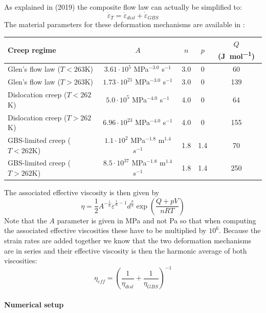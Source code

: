 As explained in \textcite{kuwd19} (2019) the composite flow law can actually be simplified to:
\[
\dot{\varepsilon}_T = \dot{\varepsilon}_{disl} + \dot{\varepsilon}_{GBS}
\]
The material parameters for these deformation mechanisms are available in \cite{kudd19}:
\begin{center}
\begin{tabular}{lcccc}
\hline
Creep regime & $A$ & $n$ & $p$ & $Q$ (\si{\joule\per\mole}) \\
\hline\hline
Glen's flow law ($T<263$K) &$3.61\cdot10^5$ MPa$^{-3.0}$ s$^{-1}$ &3.0 &0 &60\\
Glen's flow law ($T>263$K) &$1.73\cdot10^{21}$ MPa$^{-3.0}$ s$^{-1}$ &3.0 &0 &139\\
\hline
Dislocation creep ($T<262$K) & $5.0\cdot10^5$ MPa$^{-4.0}$ s$^{-1}$ &4.0 &0 &64\\
Dislocation creep ($T>262$K) &$6.96\cdot 10^{23}$ MPa$^{-4.0}$ s$^{-1}$ &4.0 &0 &155\\
\hline
GBS-limited creep ($T<262$K) & $1.1\cdot 10^2$ MPa$^{-1.8}$ m$^{1.4}$ $s^{-1}$ &1.8 &1.4 &70\\
GBS-limited creep ($T>262$K) & $8.5\cdot10^{37}$ MPa$^{-1.8}$ m$^{1.4}$ $s^{-1}$ &1.8 &1.4 &250\\
\hline
\end{tabular}
\end{center}

The associated effective viscosity is then given by 
\[
\eta = \frac{1}{2}  A^{-\frac{1}{n}} \dot{\varepsilon}^{\frac{1}{n}-1}  d^{\frac{p}{n}} \exp \left( \frac{Q+pV}{nRT} \right)
\]
Note that the $A$ parameter is given in MPa and not Pa so that when computing the 
associated effective viscosities these have to be multiplied by $10^6$.
Because the strain rates are added together we know that the two deformation mechanisms are in series and their
effective viscosity is then the harmonic average of both viscosities:
\[
\eta_{eff} = \left(\frac{1}{\eta_{disl}} + \frac{1}{\eta_{GBS}}  \right)^{-1}
\]

\paragraph{Numerical setup}

